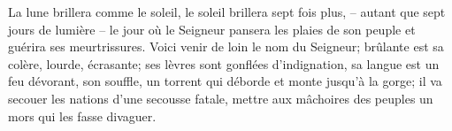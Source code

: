 La lune brillera comme le soleil, le soleil brillera sept fois plus,
	– autant que sept jours de lumière –
	le jour où le Seigneur pansera les plaies de son peuple
	et guérira ses meurtrissures.
Voici venir de loin le nom du Seigneur;
	brûlante est sa colère, lourde, écrasante;
	ses lèvres sont gonflées d’indignation, sa langue est un feu dévorant,
	son souffle, un torrent qui déborde et monte jusqu’à la gorge;
	il va secouer les nations d’une secousse fatale,
	mettre aux mâchoires des peuples un mors qui les fasse divaguer.

